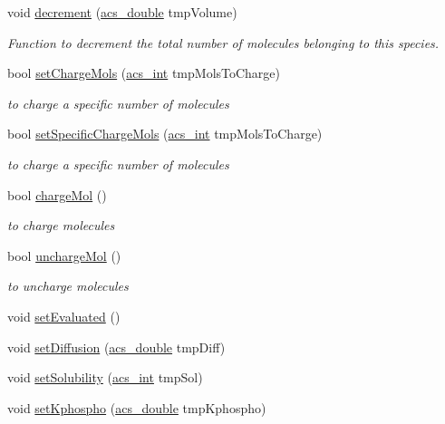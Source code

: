 \begin{DoxyCompactItemize}
\item 
void \hyperlink{a00022_ae5142c6ab199459bc1d7d5945c761f0e}{decrement} (\hyperlink{a00024_ab776853a005fcbf56af0424a2a4dd607}{acs\-\_\-double} tmp\-Volume)
\begin{DoxyCompactList}\small\item\em Function to decrement the total number of molecules belonging to this species. \end{DoxyCompactList}\item 
bool \hyperlink{a00022_a27f9852312659597efe7925124152286}{set\-Charge\-Mols} (\hyperlink{a00024_a8d277355641a098190360234e2ebde35}{acs\-\_\-int} tmp\-Mols\-To\-Charge)
\begin{DoxyCompactList}\small\item\em to charge a specific number of molecules \end{DoxyCompactList}\item 
bool \hyperlink{a00022_a088763fc6b6279040920d219f314c90e}{set\-Specific\-Charge\-Mols} (\hyperlink{a00024_a8d277355641a098190360234e2ebde35}{acs\-\_\-int} tmp\-Mols\-To\-Charge)
\begin{DoxyCompactList}\small\item\em to charge a specific number of molecules \end{DoxyCompactList}\item 
bool \hyperlink{a00022_adc36fb991695aed6503b8ed82e06bca5}{charge\-Mol} ()
\begin{DoxyCompactList}\small\item\em to charge molecules \end{DoxyCompactList}\item 
bool \hyperlink{a00022_acf8588148932adb86229eec28f7cde7c}{uncharge\-Mol} ()
\begin{DoxyCompactList}\small\item\em to uncharge molecules \end{DoxyCompactList}\item 
void \hyperlink{a00022_a089da38f8016bd588fa262cd836d1c4d}{set\-Evaluated} ()
\item 
void \hyperlink{a00022_ab4b4adbc3c26e3a8c81a090c9d1330e3}{set\-Diffusion} (\hyperlink{a00024_ab776853a005fcbf56af0424a2a4dd607}{acs\-\_\-double} tmp\-Diff)
\item 
void \hyperlink{a00022_a27c2d0448e1f56e0962132d8d360fc07}{set\-Solubility} (\hyperlink{a00024_a8d277355641a098190360234e2ebde35}{acs\-\_\-int} tmp\-Sol)
\item 
void \hyperlink{a00022_a4d33fdb252e1884841f9c671ce25973c}{set\-Kphospho} (\hyperlink{a00024_ab776853a005fcbf56af0424a2a4dd607}{acs\-\_\-double} tmp\-Kphospho)

\end{DoxyCompactItemize}
